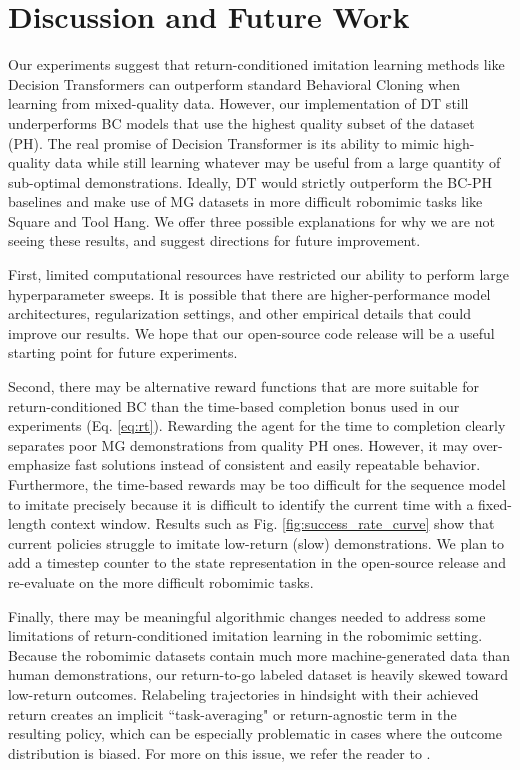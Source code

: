 \section{Discussion and Future Work}
\label{sec:discussion}
Our experiments suggest that return-conditioned imitation learning methods like Decision Transformers can outperform standard Behavioral Cloning when learning from mixed-quality data. However, our implementation of DT still underperforms BC models that use the highest quality subset of the dataset (PH). The real promise of Decision Transformer is its ability to mimic high-quality data while still learning whatever may be useful from a large quantity of sub-optimal demonstrations. Ideally, DT would strictly outperform the BC-PH baselines and make use of MG datasets in more difficult robomimic tasks like Square and Tool Hang. We offer three possible explanations for why we are not seeing these results, and suggest directions for future improvement.

First, limited computational resources have restricted our ability to perform large hyperparameter sweeps. It is possible that there are higher-performance model architectures, regularization settings, and other empirical details that could improve our results. We hope that our open-source code release will be a useful starting point for future experiments.

Second, there may be alternative reward functions that are more suitable for return-conditioned BC than the time-based completion bonus used in our experiments (Eq. \ref{eq:rt}). Rewarding the agent for the time to completion clearly separates poor MG demonstrations from quality PH ones. However, it may over-emphasize fast solutions instead of consistent and easily repeatable behavior. Furthermore, the time-based rewards may be too difficult for the sequence model to imitate precisely because it is difficult to identify the current time with a fixed-length context window. Results such as Fig. \ref{fig:success_rate_curve} show that current policies struggle to imitate low-return (slow) demonstrations. We plan to add a timestep counter to the state representation in the open-source release and re-evaluate on the more difficult robomimic tasks.

Finally, there may be meaningful algorithmic changes needed to address some limitations of return-conditioned imitation learning in the robomimic setting. Because the robomimic datasets contain much more machine-generated data than human demonstrations, our return-to-go labeled dataset is heavily skewed toward low-return outcomes. Relabeling trajectories in hindsight with their achieved return creates an implicit ``task-averaging" or return-agnostic term in the resulting policy, which can be especially problematic in cases where the outcome distribution is biased. For more on this issue, we refer the reader to \citep{eysenbach2022imitating}.
